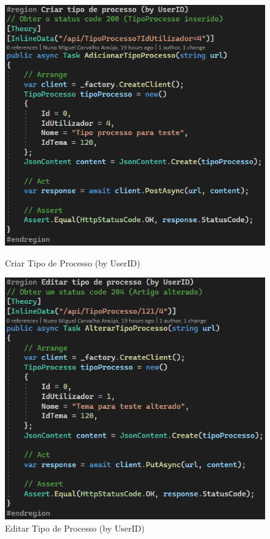 \begin{figure}[!htbp]
  \centering
  \begin{minipage}[b]{0.4\textwidth}
    \includegraphics[width=\textwidth]{Figuras/TestesUnitarios/TipoProcesso/Criar tipo de processo (by UserID).png}
    \caption{Criar Tipo de Processo (by UserID)}
    \label{d.unitario}
  \end{minipage}
  \hfill
  \begin{minipage}[b]{0.4\textwidth}
    \includegraphics[width=\textwidth]{Figuras/TestesUnitarios/TipoProcesso/Editar tipo de processo (by UserID).png}
    \caption{Editar Tipo de Processo (by UserID)}
    \label{d.unitario}
  \end{minipage}
\end{figure}


